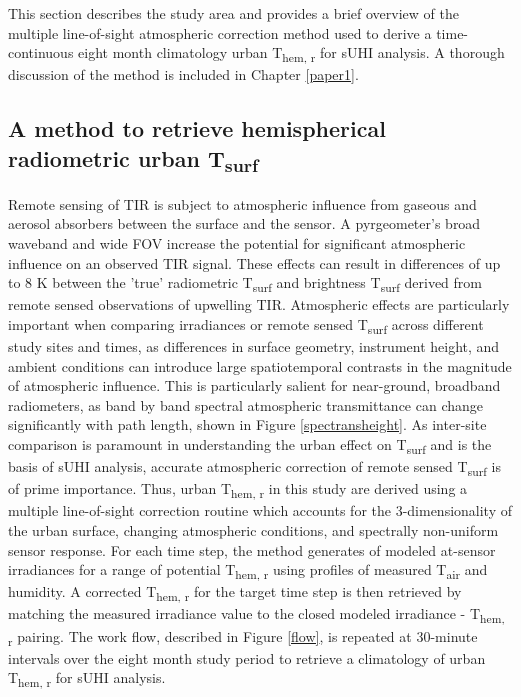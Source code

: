 This section describes the study area and provides a brief overview of the multiple line-of-sight atmospheric correction method used to derive a time-continuous eight month climatology urban T\textsubscript{hem, r} for sUHI analysis. A thorough discussion of the method is included in Chapter \ref{paper1}.

\subsection{A method to retrieve hemispherical radiometric urban T\textsubscript{surf}}

Remote sensing of TIR is subject to atmospheric influence from gaseous and aerosol absorbers between the surface and the sensor. A pyrgeometer's broad waveband and wide FOV increase the potential for significant atmospheric influence on an observed TIR signal. These effects can result in differences of up to 8 \si{\kelvin} between the 'true' radiometric T\textsubscript{surf} and brightness T\textsubscript{surf} derived from remote sensed observations of upwelling TIR. Atmospheric effects are particularly important when comparing irradiances or remote sensed T\textsubscript{surf} across different study sites and times, as differences in surface geometry, instrument height, and ambient conditions can introduce large spatiotemporal contrasts in the magnitude of atmospheric influence. This is particularly salient for near-ground, broadband radiometers, as band by band spectral atmospheric transmittance can change significantly with path length, shown in Figure \ref{spectransheight}. As inter-site comparison is paramount in understanding the urban effect on T\textsubscript{surf} and is the basis of sUHI analysis, accurate atmospheric correction of remote sensed T\textsubscript{surf} is of prime importance. Thus, urban T\textsubscript{hem, r} in this study are derived using a multiple line-of-sight correction routine which accounts for the 3-dimensionality of the urban surface, changing atmospheric conditions, and spectrally non-uniform sensor response. For each time step, the method generates of modeled at-sensor irradiances for a range of potential T\textsubscript{hem, r} using profiles of measured T\textsubscript{air} and humidity. A corrected T\textsubscript{hem, r} for the target time step is then retrieved by matching the measured irradiance value to the closed modeled irradiance - T\textsubscript{hem, r} pairing. The work flow, described in Figure \ref{flow}, is repeated at 30-minute intervals over the eight month study period to retrieve a climatology of urban T\textsubscript{hem, r} for sUHI analysis.


